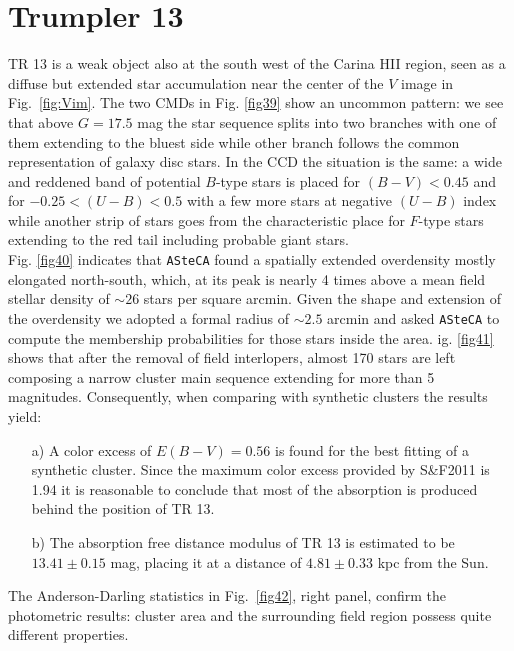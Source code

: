 \documentclass[draft]{aa}
\begin{document}
\section{Trumpler 13}

TR 13 is a weak object also at the south west of the Carina HII
region, seen as a diffuse but extended star accumulation near the center of the
$V$ image in Fig.~\ref{fig:Vim}. The two CMDs in Fig. \ref{fig39} show an
uncommon pattern: we see that above $G=17.5$ mag the star sequence splits
into two branches with one of them extending to the bluest side while other
branch follows the common representation of galaxy disc stars.
In the CCD the situation is the same: a wide and reddened band of potential
$B$-type stars is placed for $(B-V)<0.45$ and for $-0.25<(U-B)<0.5$ with a few
more stars at negative $(U-B)$ index while another strip of stars goes from the
characteristic place for $F$-type stars extending to the red tail including
probable giant stars.\\

Fig. \ref{fig40} indicates that \texttt{ASteCA} found a spatially extended
overdensity mostly elongated north-south, which, at its peak is nearly 4 times
above a mean field stellar density of $\sim26$ stars per square arcmin. Given
the shape and extension of the overdensity we adopted a formal radius of
$\sim2.5$ arcmin and asked \texttt{ASteCA} to compute the membership
probabilities for those stars inside the area. 
ig. \ref{fig41} shows that after the removal of field interlopers, almost 170
stars are left composing a narrow cluster main sequence extending for more than
5 magnitudes. Consequently, when comparing with synthetic clusters the results
yield:

\begin{itemize}
\item [a)] A color excess of $E(B-V)=0.56$ is found for the best fitting
of a synthetic cluster. Since the maximum color excess provided by S\&F2011
is 1.94 it is reasonable to conclude that most of the absorption is produced
behind the position of TR 13.
\item [b)] The absorption free distance modulus of TR 13 is estimated to be
$13.41\pm0.15$ mag, placing it at a distance of $4.81\pm0.33$ kpc from
the Sun.
\end{itemize}

The Anderson-Darling statistics in Fig.~\ref{fig42}, right panel, confirm the
photometric results: cluster area and the surrounding field region
possess quite different properties.\\
\end{document}
